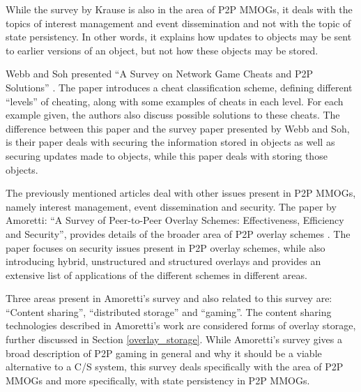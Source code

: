 \documentclass[10pt,a4paper,journal,cspaper,compsoc]{IEEEtran}
\begin{document}
While the survey by Krause is also in the area of P2P MMOGs, it deals with the topics of interest management and event dissemination and not with the
topic of state persistency. In other words, it explains how updates to objects may be sent to earlier versions of an object, but not how these
objects may be stored.

Webb and Soh presented ``A Survey on Network Game Cheats and P2P Solutions'' \cite{survey_p2p_game_cheats}. The paper introduces a cheat
classification scheme, defining different ``levels'' of cheating, along with some examples of cheats in each level. For each example given, the
authors also discuss possible solutions to these cheats. The difference between this paper and the survey paper presented by Webb and Soh, is their
paper deals with securing the information stored in objects as well as securing updates made to objects, while this paper deals with storing those
objects.

The previously mentioned articles deal with other issues present in P2P MMOGs, namely interest management, event dissemination and security. The
paper by Amoretti: ``A Survey of Peer-to-Peer Overlay Schemes: Effectiveness, Efficiency and Security'', provides details of the broader area of P2P
overlay schemes \cite{amoretti_p2p_overlay_schemes_survey}. The paper focuses on security issues present in P2P overlay schemes, while also
introducing hybrid, unstructured and structured overlays and provides an extensive list of applications of the different schemes in different areas.

Three areas present in Amoretti's survey and also related to this survey are: ``Content sharing'', ``distributed storage'' and ``gaming''. The
content sharing technologies described in Amoretti's work are considered forms of overlay storage, further discussed in Section
\ref{overlay_storage}. While Amoretti's survey gives a broad description of P2P gaming in general and why it should be a viable alternative to a C/S
system, this survey deals specifically with the area of P2P MMOGs and more specifically, with state persistency in P2P MMOGs.
\end{document}
